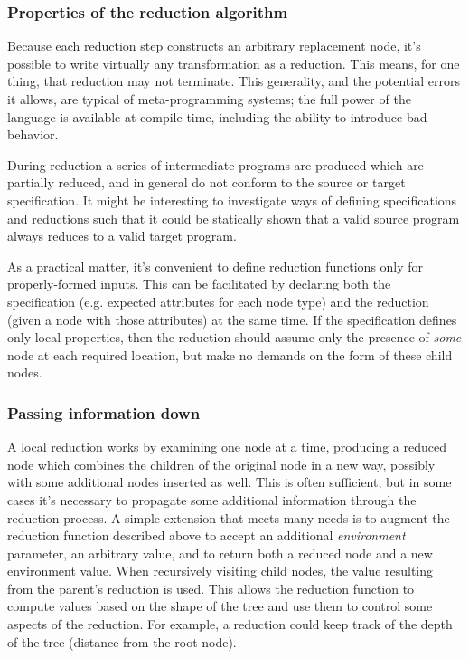 

\subsubsection{Properties of the reduction algorithm}
Because each reduction step constructs an arbitrary replacement node, it's possible to write virtually any transformation as a reduction. This means, for one thing, that reduction may not terminate. This generality, and the potential errors it allows, are typical of meta-programming systems; the full power of the language is available at compile-time, including the ability to introduce bad behavior.

During reduction a series of intermediate programs are produced which are partially reduced, and in general do not conform to the source or target specification. It might be interesting to investigate ways of defining specifications and reductions such that it could be statically shown that a valid source program always reduces to a valid target program.

As a practical matter, it's convenient to define reduction functions only for properly-formed inputs. This can be facilitated by declaring both the specification (e.g. expected attributes for each node type) and the reduction (given a node with those attributes) at the same time. If the specification defines only local properties, then the reduction should assume only the presence of \emph{some} node at each required location, but make no demands on the form of these child nodes. 


\subsubsection{Passing information down}
A local reduction works by examining one node at a time, producing a reduced node which combines the children of the original node in a new way, possibly with some additional nodes inserted as well. This is often sufficient, but in some cases it's necessary to propagate some additional information through the reduction process. A simple extension that meets many needs is to augment the reduction function described above to accept an additional \emph{environment} parameter, an arbitrary value, and to return both a reduced node and a new environment value. When recursively visiting child nodes, the value resulting from the parent's reduction is used. This allows the reduction function to compute values based on the shape of the tree and use them to control some aspects of the reduction. For example, a reduction could keep track of the depth of the tree (distance from the root node).

